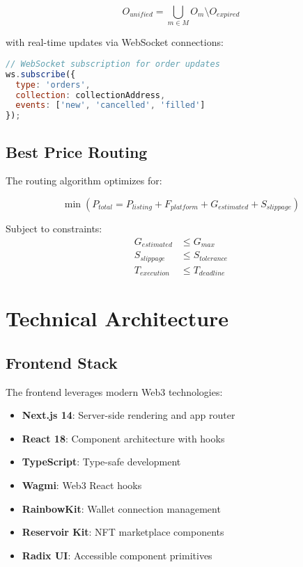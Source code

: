 \documentclass[11pt,a4paper]{article}
\begin{document}
\begin{equation}
O_{unified} = \bigcup_{m \in M} O_m \setminus O_{expired}
\end{equation}

with real-time updates via WebSocket connections:

\begin{lstlisting}[language=JavaScript]
// WebSocket subscription for order updates
ws.subscribe({
  type: 'orders',
  collection: collectionAddress,
  events: ['new', 'cancelled', 'filled']
});
\end{lstlisting}

\subsection{Best Price Routing}

The routing algorithm optimizes for:

\begin{equation}
\min \left( P_{total} = P_{listing} + F_{platform} + G_{estimated} + S_{slippage} \right)
\end{equation}

Subject to constraints:
\begin{align}
G_{estimated} &\leq G_{max} \\
S_{slippage} &\leq S_{tolerance} \\
T_{execution} &\leq T_{deadline}
\end{align}

\section{Technical Architecture}

\subsection{Frontend Stack}

The frontend leverages modern Web3 technologies:

\begin{itemize}
\item \textbf{Next.js 14}: Server-side rendering and app router
\item \textbf{React 18}: Component architecture with hooks
\item \textbf{TypeScript}: Type-safe development
\item \textbf{Wagmi}: Web3 React hooks
\item \textbf{RainbowKit}: Wallet connection management
\item \textbf{Reservoir Kit}: NFT marketplace components
\item \textbf{Radix UI}: Accessible component primitives
\end{itemize}
\end{document}
